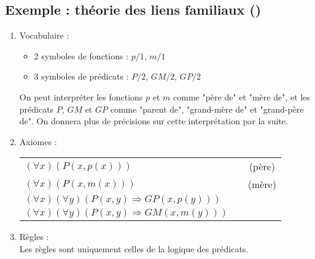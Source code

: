 \subsection{Exemple : théorie des liens familiaux ()}
\begin{enumerate}
\item Vocabulaire : 
\begin{itemize}
\item 2 symboles de fonctions : $p/1$, $m/1$
\item 3 symboles de prédicats : $P/2$, $GM/2$, $GP/2$\\
\end{itemize}

On peut interpréter les fonctions $p$ et $m$ comme "père de" et "mère de", et les prédicats $P$, $GM$ et $GP$ comme "parent de", "grand-mère de" et "grand-père de". On donnera plus de précisions sur cette interprétation par la suite.\\

\item Axiomes : \\
\begin{center}
\begin{tabular}{lcc}
$(\forall x) \left(P(x,p(x))\right)$ & \hspace*{2cm}& (père)\\
$(\forall x) \left(P(x,m(x))\right)$ & \hspace*{2cm}& (mère)\\
$(\forall x)(\forall y) \left(P(x,y)\Rightarrow GP(x,p(y)) \right)$&&\\
$(\forall x)(\forall y) \left(P(x,y)\Rightarrow GM(x,m(y)) \right)$&&\\
\end{tabular}
\end{center}

\item Règles : \\
Les règles sont uniquement celles de la logique des prédicats.
\end{enumerate}
